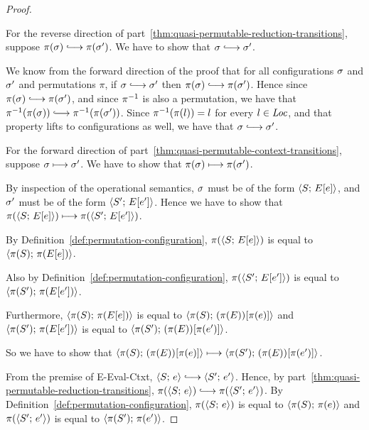 \begin{proof}
\begin{itemize}
  \end{itemize}

  For the reverse direction of
  part~\ref{thm:quasi-permutable-reduction-transitions}, suppose
  $\pi(\conf) \parstepsto \pi(\conf')$.  We have to show that $\conf
  \parstepsto \conf'$.

  We know from the forward direction of the proof that for all
  configurations $\sigma$ and $\sigma'$ and permutations $\pi$, if
  $\conf \parstepsto \conf'$ then $\pi(\conf) \parstepsto
  \pi(\conf')$.  Hence since $\pi(\conf) \parstepsto \pi(\conf')$, and
  since $\pi^{-1}$ is also a permutation, we have that
  $\piinv(\pi(\conf)) \parstepsto \piinv(\pi(\conf'))$.  Since
  $\pi^{-1}(\pi(l)) = l$ for every $l \in \mathit{Loc}$, and that property lifts
  to configurations as well, we have that $\conf \parstepsto \conf'$.


  For the forward direction of
  part~\ref{thm:quasi-permutable-context-transitions}, suppose $\sigma
  \longmapsto \sigma'$.  We have to show that $\pi(\sigma) \longmapsto
  \pi(\sigma')$.

  By inspection of the operational semantics, $\sigma$ must be of the
  form $\langle S;\, E\hspace{-0.5mm}\left[e\right] \rangle$, and $\sigma'$ must be of the form
  $\langle S';\, E\hspace{-0.5mm}\left[e'\right] \rangle$.  Hence we have to show that
  $\pi(\langle S;\, E\hspace{-0.5mm}\left[e\right] \rangle) \longmapsto \pi(\langle S';\, E\hspace{-0.5mm}\left[e'\right] \rangle)$.

  By Definition~\ref{def:permutation-configuration},
  $\pi(\langle S;\, E\hspace{-0.5mm}\left[e\right] \rangle)$ is equal to $\langle \pi(S);\, \pi(E\hspace{-0.5mm}\left[e\right]) \rangle$.

  Also by Definition~\ref{def:permutation-configuration},
  $\pi(\langle S';\, E\hspace{-0.5mm}\left[e'\right] \rangle)$ is equal to
  $\langle \pi(S');\, \pi(E\hspace{-0.5mm}\left[e'\right]) \rangle$.

  Furthermore, $\langle \pi(S);\, \pi(E\hspace{-0.5mm}\left[e\right]) \rangle$ is equal to
  $\langle \pi(S);\, (\pi(E))\hspace{-0.5mm}\left[\pi(e)\right] \rangle$ and
  $\langle \pi(S');\, \pi(E\hspace{-0.5mm}\left[e'\right]) \rangle$ is equal to
  $\langle \pi(S');\, (\pi(E))\hspace{-0.5mm}\left[\pi(e')\right] \rangle$.

  So we have to show that
  $\langle \pi(S);\, (\pi(E))\hspace{-0.5mm}\left[\pi(e)\right] \rangle \longmapsto
  \langle \pi(S');\, (\pi(E))\hspace{-0.5mm}\left[\pi(e')\right] \rangle$.

  From the premise of {\sc E-Eval-Ctxt}, $\config{S}{e} \parstepsto
  \config{S'}{e'}$.  Hence, by
  part~\ref{thm:quasi-permutable-reduction-transitions},
  $\pi(\config{S}{e}) \parstepsto \pi(\config{S'}{e'})$.  By
  Definition~\ref{def:permutation-configuration}, $\pi(\langle S;\, e \rangle)$
  is equal to $\langle \pi(S);\, \pi(e) \rangle$ and $\pi(\langle S';\, e' \rangle)$ is
  equal to $\langle \pi(S');\, \pi(e') \rangle$.


\end{proof}
